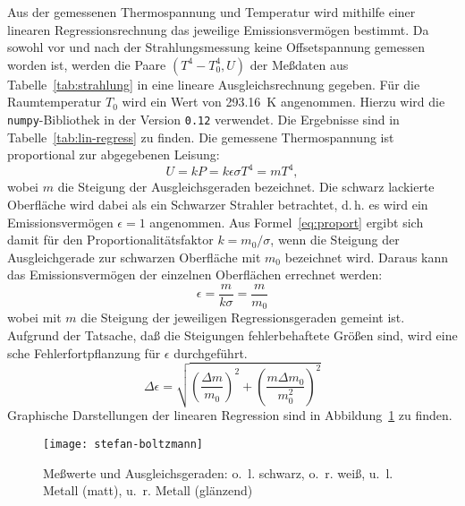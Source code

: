 Aus der gemessenen Thermospannung und Temperatur wird mithilfe einer
linearen Regressionsrechnung das jeweilige Emissionsvermögen
bestimmt. Da sowohl vor und nach der Strahlungsmessung keine
Offsetspannung gemessen worden ist, werden die Paare $(T^4-T_0^4, U)$
der Meßdaten aus Tabelle~\ref{tab:strahlung} in eine lineare
Ausgleichsrechnung gegeben. Für die Raumtemperatur $T_0$ wird ein Wert
von \SI{293.16}{\kelvin} angenommen. Hierzu wird die
\texttt{numpy}-Bibliothek in der Version \texttt{0.12} verwendet. Die
Ergebnisse sind in Tabelle~\ref{tab:lin-regress} zu finden. Die
gemessene Thermospannung ist proportional zur abgegebenen Leisung:
\begin{equation}
  \label{eq:proport}
  U = k P = k \epsilon \sigma T^4 = m T^4,
\end{equation}
wobei $m$ die Steigung der Ausgleichsgeraden bezeichnet. Die schwarz
lackierte Oberfläche wird dabei als ein Schwarzer Strahler betrachtet,
d.\,h. es wird ein Emissionsvermögen $\epsilon = 1$ angenommen. Aus
Formel~\ref{eq:proport} ergibt sich damit für den
Proportionalitätsfaktor $k = m_0/\sigma$, wenn die Steigung der
Ausgleichgerade zur schwarzen Oberfläche mit $m_0$ bezeichnet
wird. Daraus kann das Emissionsvermögen der einzelnen Oberflächen
errechnet werden:
\begin{equation}
  \epsilon = \frac{m}{k \sigma} = \frac{m}{m_0}
\end{equation}
wobei mit $m$ die Steigung der jeweiligen Regressionsgeraden gemeint
ist. Aufgrund der Tatsache, daß die Steigungen fehlerbehaftete Größen
sind, wird eine sche Fehlerfortpflanzung für $\epsilon$
durchgeführt.
\begin{equation}
  \label{eq:gauss-epsilon}
  \Delta\epsilon = \sqrt{ \left(\frac{\Delta m}{m_0}\right)^2 +
    \left(\frac{m \Delta m_0}{m_0^2}\right)^2}
\end{equation}
Graphische Darstellungen der linearen Regression sind in
Abbildung~\ref{fig:plot-emission} zu finden.



\begin{figure}
  \centering
  \texttt{[image: stefan-boltzmann]}
  \caption{Meßwerte und Ausgleichsgeraden: o.~l. schwarz, o.~r. weiß,
    u.~l. Metall (matt), u.~r. Metall (glänzend)}
  \label{fig:plot-emission}
\end{figure}

